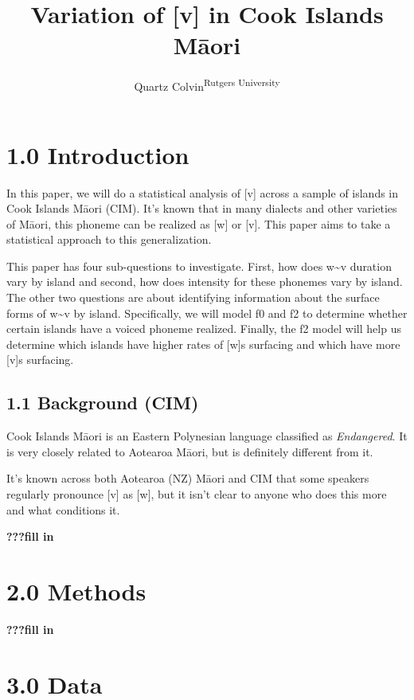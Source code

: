 \documentclass[
  ,man,floatsintext]{apa6}
\title{Variation of {[}v{]} in Cook Islands Māori}
\author{Quartz Colvin\textsuperscript{Rutgers University}}
\date{}
\affiliation{\phantom{0}}
\begin{document}
\maketitle

\section{1.0 Introduction}\label{introduction}

In this paper, we will do a statistical analysis of {[}v{]} across a sample of islands in Cook Islands Māori (CIM). It's known that in many dialects and other varieties of Māori, this phoneme can be realized as {[}w{]} or {[}v{]}. This paper aims to take a statistical approach to this generalization.

This paper has four sub-questions to investigate. First, how does w\textasciitilde v duration vary by island and second, how does intensity for these phonemes vary by island. The other two questions are about identifying information about the surface forms of w\textasciitilde v by island. Specifically, we will model f0 and f2 to determine whether certain islands have a voiced phoneme realized. Finally, the f2 model will help us determine which islands have higher rates of {[}w{]}s surfacing and which have more {[}v{]}s surfacing.

\subsection{1.1 Background (CIM)}\label{background-cim}

Cook Islands Māori is an Eastern Polynesian language classified as \emph{Endangered}. It is very closely related to Aotearoa Māori, but is definitely different from it.

It's known across both Aotearoa (NZ) Māori and CIM that some speakers regularly pronounce {[}v{]} as {[}w{]}, but it isn't clear to anyone who does this more and what conditions it.

\textbf{???fill in}

\section{2.0 Methods}\label{methods}

\textbf{???fill in}

\section{3.0 Data}\label{data}
\end{document}
